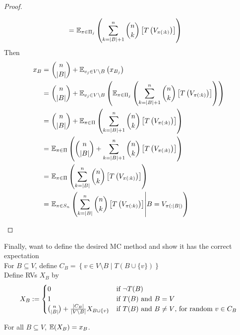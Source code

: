 \documentclass{article}
\begin{document}
\begin{proof}
\begin{itemize}
\begin{itemize}
\begin{align*}
      =\ &\mathbb{E}_{\pi \in \Pi_j}\left(\sum_{k=\left\vert B \right\vert+1}^n\binom{n}{k}\left[T\left(V_{\pi(:k)}\right)\right]\right)
    \end{align*}
    Then
    \begin{align*}
      x_B
      =\ &\binom{n}{\left\vert B \right\vert}+\mathbb{E}_{v_j \in V \setminus B}\left(x_{B_j}\right) \\
      =\ &\binom{n}{\left\vert B \right\vert}+\mathbb{E}_{v_j \in V \setminus B}\left(\mathbb{E}_{\pi \in \Pi_j}\left(\sum_{k=\left\vert B \right\vert+1}^n\binom{n}{k}\left[T\left(V_{\pi(:k)}\right)\right]\right)\right) \\
      =\ &\binom{n}{\left\vert B \right\vert}+\mathbb{E}_{\pi \in \Pi}\left(\sum_{k=\left\vert B \right\vert+1}^n\binom{n}{k}\left[T\left(V_{\pi(:k)}\right)\right]\right) \\
      =\ &\mathbb{E}_{\pi \in \Pi}\left(\binom{n}{\left\vert B \right\vert}+\sum_{k=\left\vert B \right\vert+1}^n\binom{n}{k}\left[T\left(V_{\pi(:k)}\right)\right]\right) \\
      =\ &\mathbb{E}_{\pi \in \Pi}\left(\sum_{k=\left\vert B \right\vert}^n\binom{n}{k}\left[T\left(V_{\pi(:k)}\right)\right]\right) \\
      =\ &\mathbb{E}_{\pi \in S_n}\left(\sum_{k=\left\vert B \right\vert}^n\binom{n}{k}\left[T\left(V_{\pi(:k)}\right)\right] \middle| B = V_{\pi(:\left\vert B \right\vert)}\right)
    \end{align*}
  \end{itemize}
\end{itemize}
\end{proof}
Finally, want to define the desired MC method and show it has the correct expectation \\
For $B \subseteq V$, define $C_B = \left\{v \in V \setminus B \middle| T(B \cup \{v\})\right\}$ \\
Define RVs $X_B$ by
\[
X_B :=
\begin{cases}
  0 & \text{if $\lnot T(B)$} \\
  1 & \text{if $T(B)$ and $B = V$} \\
  \binom{n}{\left\vert B \right\vert}+\frac{\left\vert C_B \right\vert}{\left\vert V \setminus B \right\vert}X_{B \cup \{v\}} & \text{if $T(B)$ and $B \neq V$, for random $v \in C_B$}
\end{cases}
\]
\begin{lemma}
  For all $B \subseteq V$, $\mathbb{E}(X_B) = x_B$.
\end{lemma}
\end{document}
